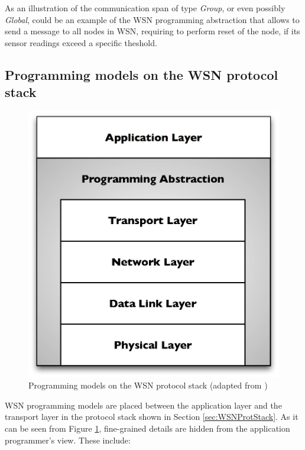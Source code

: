  As an illustration of the communication span of type \emph{Group}, or even
 possibly \emph{Global}, could be an example of the WSN programming abstraction
 that allows to send a message to all nodes in WSN, requiring to perform reset of the node, if
 its sensor readings exceed a specific theshold.

\subsection{Programming models on the WSN protocol stack}

\begin{figure}
\centering
\includegraphics[scale=0.61]{img/ProtStack_ProgAbstr.eps}
\caption[Programming models on the WSN protocol stack]{Programming models on the WSN protocol
stack (adapted from \cite{mottola_middleware:2008})}
\label{Fig:ProtStack_ProgAbstr}
\end{figure}

WSN programming models are placed between the application layer and the
transport layer in the
protocol stack shown in Section \ref{sec:WSNProtStack}. As it can be seen from
Figure \ref{Fig:ProtStack_ProgAbstr},
fine-grained details are hidden from the application programmer's view. These
include:

